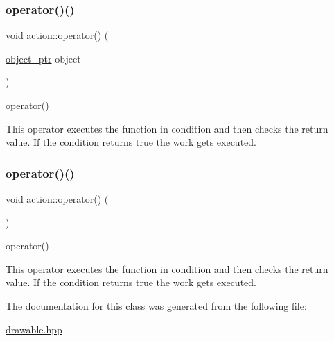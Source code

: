 \subsubsection{\texorpdfstring{operator()()}{operator()()}\hspace{0.1cm}{\footnotesize\ttfamily [1/2]}}
{\footnotesize\ttfamily void action\+::operator() (\begin{DoxyParamCaption}\item[{\hyperlink{typedefs_8hpp_aab5add95f06d2ba25dbfed8eb07274fa}{object\+\_\+ptr}}]{object }\end{DoxyParamCaption})\hspace{0.3cm}{\ttfamily [inline]}}



operator() 

This operator executes the function in condition and then checks the return value. If the condition returns true the work gets executed. \mbox{\label{classaction_a92c003677656b5b3e6e58b19376e6b04}} 
\subsubsection{\texorpdfstring{operator()()}{operator()()}\hspace{0.1cm}{\footnotesize\ttfamily [2/2]}}
{\footnotesize\ttfamily void action\+::operator() (\begin{DoxyParamCaption}{ }\end{DoxyParamCaption})\hspace{0.3cm}{\ttfamily [inline]}}



operator() 

This operator executes the function in condition and then checks the return value. If the condition returns true the work gets executed. 

The documentation for this class was generated from the following file\+:\begin{DoxyCompactItemize}
\item 
\hyperlink{drawable_8hpp}{drawable.\+hpp}\end{DoxyCompactItemize}
